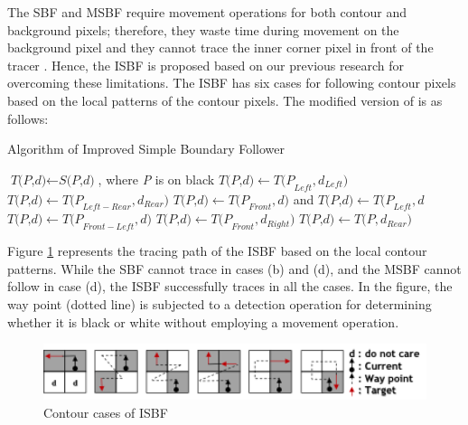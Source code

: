 The SBF and MSBF require movement operations for both contour and background pixels; therefore, they waste time during movement on the background pixel and they cannot trace the inner corner pixel in front of the tracer \cite{Cheong2006Improved,Toussaint????Grids}. Hence, the ISBF \cite{Cheong2006Improved} is proposed based on our previous research for overcoming these limitations. The ISBF has six cases for following contour pixels based on the local patterns of the contour pixels. The modified version of \cite{Cheong2006Advanced} is as follows: 

\begin{algorithm}
\caption{Algorithm of Improved Simple Boundary Follower}\label{alg:isbf}
\begin{algorithmic}[1]
\State $\textit{T(P,d)} \gets \textit{S(P,d)}$, where \textit{P} is on black
\Do
{}
	\State $\textit{T(P,d)} \gets \textit{T(P}_{Left},\textit{d}_{Left} )  $
\Else
		\State $\textit{T(P,d)} \gets \textit{T(P}_{Left-Rear},\textit{d}_{Rear} )  $
	\Else
				\State $\textit{T(P,d)} \gets \textit{T(P}_{Front},\textit{d} )  $ and $\textit{T(P,d)} \gets \textit{T(P}_{Left}, \textit{d}$
			\Else
				\State $\textit{T(P,d)} \gets \textit{T(P}_{Front-Left},\textit{d} )  $
			\EndIf
			\State $\textit{T(P,d)} \gets \textit{T(P}_{Front},\textit{d}_{Right} )  $
		\Else
			\State $\textit{T(P,d)} \gets \textit{T(P},\textit{d}_{Rear} )  $
		\EndIf
	\EndIf
\EndIf
{}
\EndProcedure
\end{algorithmic}
\end{algorithm}

Figure \ref{fig:isbf} represents the tracing path of the ISBF based on the local contour patterns. While the SBF cannot trace in cases (b) and (d), and the MSBF cannot follow in case (d), the ISBF successfully traces in all the cases. In the figure, the way point (dotted line) is subjected to a detection operation for determining whether it is black or white without employing a movement operation.

\begin{figure}[htbp]
	\centering
	\includegraphics[width=1.0\textwidth]{2.RelatedWorks/isbf.png}
	\caption{Contour cases of ISBF \cite{Cheong2006Advanced}}
	\label{fig:isbf}
\end{figure}

